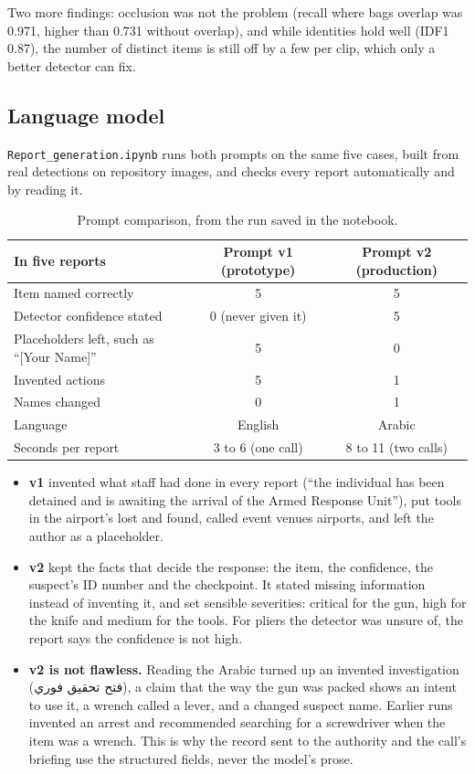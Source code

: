 \documentclass[11pt,a4paper]{article}
\newcommand{\ar}[1]{\textarabic{#1}}
\newcommand{\code}[1]{\texttt{#1}}
\begin{document}
Two more findings: occlusion was not the problem (recall where bags overlap was 0.971, higher than
0.731 without overlap), and while identities hold well (IDF1 0.87), the number of distinct items is
still off by a few per clip, which only a better detector can fix.

\subsection{Language model}
\label{sec:llm}

\code{Report\_generation.ipynb} runs both prompts on the same five cases, built from real detections on
repository images, and checks every report automatically and by reading it.

\begin{table}[H]
\centering
\small
\begin{tabular}{@{}lcc@{}}
\toprule
In five reports & Prompt v1 (prototype) & Prompt v2 (production) \\
\midrule
Item named correctly & 5 & 5 \\
Detector confidence stated & 0 (never given it) & 5 \\
Placeholders left, such as ``[Your Name]'' & 5 & 0 \\
Invented actions & 5 & 1 \\
Names changed & 0 & 1 \\
Language & English & Arabic \\
Seconds per report & 3 to 6 (one call) & 8 to 11 (two calls) \\
\bottomrule
\end{tabular}
\caption{Prompt comparison, from the run saved in the notebook.}
\end{table}

\begin{itemize}
  \item \textbf{v1} invented what staff had done in every report (``the individual has been detained
        and is awaiting the arrival of the Armed Response Unit''), put tools in the airport's lost and
        found, called event venues airports, and left the author as a placeholder.
  \item \textbf{v2} kept the facts that decide the response: the item, the confidence, the suspect's
        ID number and the checkpoint. It stated missing information instead of inventing it, and set
        sensible severities: critical for the gun, high for the knife and medium for the tools. For
        pliers the detector was unsure of, the report says the confidence is not high.
  \item \textbf{v2 is not flawless.} Reading the Arabic turned up an invented investigation
        (\ar{فتح تحقيق فوري}), a claim that the way the gun was packed shows an intent to use it, a
        wrench called a lever, and a changed suspect name. Earlier runs invented an arrest and
        recommended searching for a screwdriver when the item was a wrench. This is why the record
        sent to the authority and the call's briefing use the structured fields, never the model's
        prose.
\end{itemize}
\end{document}
